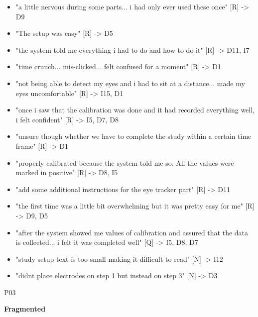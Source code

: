 \documentclass[
]{article}
\begin{document}
\begin{itemize}
\item
  "a little nervous during some parts... i had only ever used these once" {[}R{]} -\textgreater{} D9
\item
  "The setup was easy" {[}R{]} -\textgreater{} D5
\item
  "the system told me everything i had to do and how to do it" {[}R{]} -\textgreater{} D11, I7
\item
  "time crunch... mis-clicked... felt confused for a moment" {[}R{]} -\textgreater{} D1
\item
  "not being able to detect my eyes and i had to sit at a distance... made my eyes uncomfortable" {[}R{]} -\textgreater{} I15, D1
\item
  "once i saw that the calibration was done and it had recorded everything well, i felt confident" {[}R{]} -\textgreater{} I5, D7, D8
\item
  "unsure though whether we have to complete the study within a certain time frame" {[}R{]} -\textgreater{} D1
\item
  "properly calibrated because the system told me so. All the values were marked in positive" {[}R{]} -\textgreater{} D8, I5
\item
  "add some additional instructions for the eye tracker part" {[}R{]} -\textgreater{} D11
\item
  "the first time was a little bit overwhelming but it was pretty easy for me" {[}R{]} -\textgreater{} D9, D5
\item
  "after the system showed me values of calibration and assured that the data is collected... i felt it was completed well" {[}Q{]} -\textgreater{} I5, D8, D7
\item
  "study setup text is too small making it difficult to read" {[}N{]} -\textgreater{} I12
\item
  "didnt place electrodes on step 1 but instead on step 3" {[}N{]} -\textgreater{} D3
\end{itemize}

P03

\textbf{Fragmented}
\end{document}
